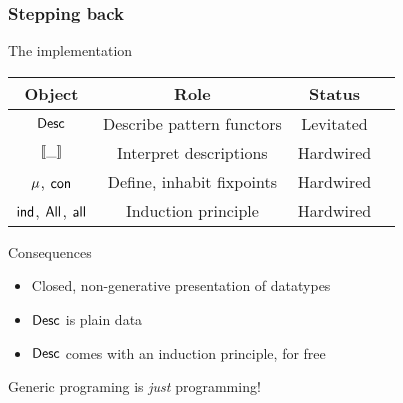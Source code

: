 \documentclass{beamer}
\begin{document}
\newcommand{\SYMBind}{\F{ind}}
\begin{frame}

\frametitle{Stepping back}

\begin{block}{The implementation}

\begin{center}
\begin{tabular}{|c|c|c|c|}
\hline
Object                & Role                        & Status \\
\hline
\hline
$\Desc$               & Describe pattern functors   & Levitated \\
\hline
$\SYMBdescop{\_}$     & Interpret descriptions      & Hardwired \\
\hline
$\SYMBMu$, $\SYMBCon$ & Define, inhabit fixpoints   & Hardwired \\
\hline
$\SYMBind$, $\SYMBAll$, $\SYMBall$  
                      & Induction principle         & Hardwired \\
\hline
\end{tabular}
\end{center}

\end{block}

\begin{block}{Consequences}
\begin{itemize}
\item Closed, non-generative presentation of datatypes
\item \(\Desc\) is plain data
\item \(\Desc\) comes with an induction principle, for free
\end{itemize}
\end{block}

\begin{center}
\huge{Generic programing is \emph{just} programming!}
\end{center}

\end{frame}
\end{document}
